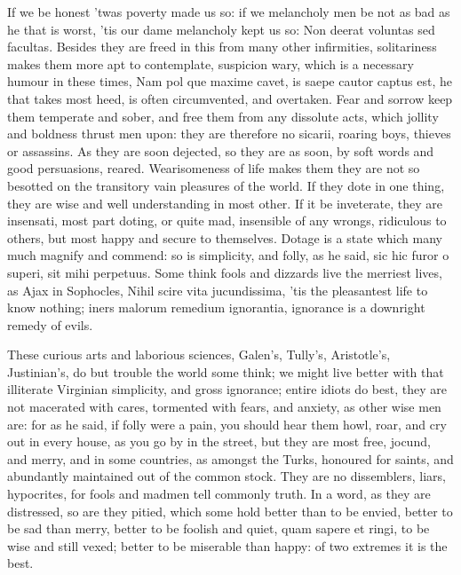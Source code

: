 {If we be honest 'twas poverty made us so: if we melancholy men be not
as bad as he that is worst, 'tis our dame melancholy kept us so: Non
deerat voluntas sed facultas. 
Besides they are freed in this from many other infirmities,
solitariness makes them more apt to contemplate, suspicion wary, which
is a necessary humour in these times, Nam pol que maxime cavet,
is saepe cautor captus est, he that takes most heed, is often
circumvented, and overtaken. Fear and sorrow keep them temperate and
sober, and free them from any dissolute acts, which jollity and
boldness thrust men upon: they are therefore no sicarii, roaring boys,
thieves or assassins. As they are soon dejected, so they are as soon,
by soft words and good persuasions, reared. Wearisomeness of life makes
them they are not so besotted on the transitory vain pleasures of the
world. If they dote in one thing, they are wise and well understanding
in most other. If it be inveterate, they are insensati, most part
doting, or quite mad, insensible of any wrongs, ridiculous to others,
but most happy and secure to themselves. Dotage is a state which many
much magnify and commend: so is simplicity, and folly, as he said,
sic hic furor o superi, sit mihi perpetuus. Some think fools and
dizzards live the merriest lives, as Ajax in Sophocles, Nihil scire
vita jucundissima, 'tis the pleasantest life to know nothing; iners
malorum remedium ignorantia, ignorance is a downright remedy of evils.

These curious arts and laborious sciences, Galen's, Tully's,
Aristotle's, Justinian's, do but trouble the world some think; we might
live better with that illiterate Virginian simplicity, and gross
ignorance; entire idiots do best, they are not macerated with cares,
tormented with fears, and anxiety, as other wise men are: for as
he said, if folly were a pain, you should hear them howl, roar,
and cry out in every house, as you go by in the street, but they are
most free, jocund, and merry, and in some countries, as amongst
the Turks, honoured for saints, and abundantly maintained out of the
common stock. They are no dissemblers, liars, hypocrites, for
fools and madmen tell commonly truth. In a word, as they are
distressed, so are they pitied, which some hold better than to be
envied, better to be sad than merry, better to be foolish and quiet,
quam sapere et ringi, to be wise and still vexed; better to be
miserable than happy: of two extremes it is the best.


}
